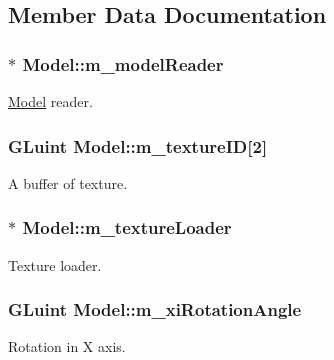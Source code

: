 \subsection{Member Data Documentation}
\subsubsection[{\texorpdfstring{m\+\_\+model\+Reader}{m_modelReader}}]{$\ast$ Model\+::m\+\_\+model\+Reader\hspace{0.3cm}{\ttfamily [private]}}\hypertarget{class_model_a3247a4733aa6155e6ed8649cca51d658}{}\label{class_model_a3247a4733aa6155e6ed8649cca51d658}
\hyperlink{class_model}{Model} reader. 
\subsubsection[{\texorpdfstring{m\+\_\+texture\+ID}{m_textureID}}]{\setlength{\rightskip}{0pt plus 5cm}G\+Luint Model\+::m\+\_\+texture\+ID\mbox{[}2\mbox{]}\hspace{0.3cm}{\ttfamily [private]}}\hypertarget{class_model_a23d182da28544aa34e44752eabaa0422}{}\label{class_model_a23d182da28544aa34e44752eabaa0422}
A buffer of texture. 
\subsubsection[{\texorpdfstring{m\+\_\+texture\+Loader}{m_textureLoader}}]{$\ast$ Model\+::m\+\_\+texture\+Loader\hspace{0.3cm}{\ttfamily [private]}}\hypertarget{class_model_aade88da2d54d5fa74bd941a1b6f92cc3}{}\label{class_model_aade88da2d54d5fa74bd941a1b6f92cc3}
Texture loader. 
\subsubsection[{\texorpdfstring{m\+\_\+xi\+Rotation\+Angle}{m_xiRotationAngle}}]{\setlength{\rightskip}{0pt plus 5cm}G\+Luint Model\+::m\+\_\+xi\+Rotation\+Angle\hspace{0.3cm}{\ttfamily [private]}}\hypertarget{class_model_ac0b7f3944641754dba82add1bc4604fc}{}\label{class_model_ac0b7f3944641754dba82add1bc4604fc}
Rotation in X axis. 
